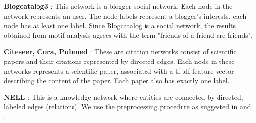\documentclass{article}
\theoremstyle{definition}
\begin{document}
\textbf{Blogcatalog3} \cite{blogcatalog}: This network is a blogger social network.
Each node in the network represents an user. The node labels represent a blogger's
interests, each node has at least one label. Since Blogcatalog is a social network,
the results obtained from motif analysis agrees with the term "friends of a friend
are friends".

\textbf{Citeseer, Cora, Pubmed} \cite{crp}: These are citation
networks consist of scientific papers and their citations represented by directed
edges. Each node in these networks represents a scientific paper, associated
with a tf-idf feature vector describing the content of the paper. Each paper
also has exactly one label.

\textbf{NELL} \cite{nell}: This is a knowledge network where entities are connected
by directed, labeled edges (relations). We use the preprocessing procedure as
suggested in \cite{gcn} and \cite{planetoid}.

\begin{table}
\centering
{}
\caption{Datasets for unsupervised embeddings}
\label{t:ungraph}
\end{table}
\end{document}
